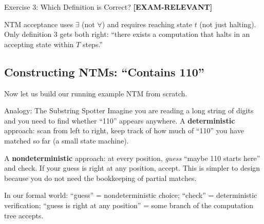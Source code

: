 \documentclass[11pt,a4paper]{article}
\newcommand{\kemark}{\textcolor{red!70!black}{\textbf{[EXAM-RELEVANT]}}}
\newcommand{\kt}[1]{\par\vspace{0.3em}\colorbox{yellow!60}{\parbox{\dimexpr\linewidth-2\fboxsep}{#1}}\vspace{0.3em}}
\begin{document}
\begin{conceptbox}{Exercise 3: Which Definition is Correct? \kemark}
\kt{NTM acceptance uses $\exists$ (not $\forall$) and requires reaching state $t$ (not just halting). Only definition 3 gets both right: ``there exists a computation that halts in an accepting state within $T$ steps.''}
\end{conceptbox}

\subsection{Constructing NTMs: ``Contains 110''} \label{sec:ntm110}

Now let us build our running example NTM from scratch.

\begin{notebox}{Analogy: The Substring Spotter}
Imagine you are reading a long string of digits and you need to find whether ``110'' appears anywhere. A \textbf{deterministic} approach: scan from left to right, keep track of how much of ``110'' you have matched so far (a small state machine).

A \textbf{nondeterministic} approach: at every position, \textit{guess} ``maybe 110 starts here'' and check. If your guess is right at any position, accept. This is simpler to design because you do not need the bookkeeping of partial matches.

In our formal world: ``guess'' = nondeterministic choice; ``check'' = deterministic verification; ``guess is right at any position'' = some branch of the computation tree accepts.
\end{notebox}
\end{document}
